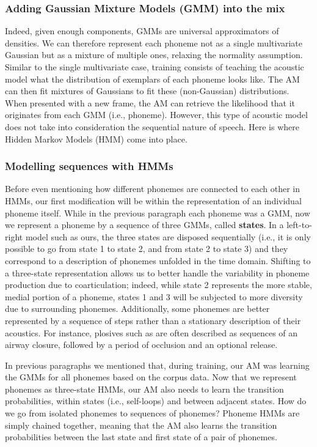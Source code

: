 \subsubsection{Adding Gaussian Mixture Models (GMM) into the mix}
Indeed, given enough components, GMMs are universal approximators of densities. We can therefore represent each phoneme not as a single multivariate Gaussian but as a mixture of multiple ones, relaxing the normality assumption. Similar to the single multivariate case, training consists of teaching the acoustic model what the distribution of exemplars of each phoneme looks like. The AM can then fit mixtures of Gaussians to fit these (non-Gaussian) distributions. When presented with a new frame, the AM can retrieve the likelihood that it originates from each GMM (i.e., phoneme). However, this type of acoustic model does not take into consideration the sequential nature of speech. Here is where Hidden Markov Models (HMM) come into place.   

\subsubsection{Modelling sequences with HMMs}
Before even mentioning how different phonemes are connected to each other in HMMs, our first modification will be within the representation of an individual phoneme itself. While in the previous paragraph each phoneme was a GMM, now we represent a phoneme by a sequence of three GMMs, called \textbf{states}. In a left-to-right model such as ours, the three states are disposed sequentially (i.e., it is only possible to go from state 1 to state 2, and from state 2 to state 3) and they correspond to a description of phonemes unfolded in the time domain. Shifting to a three-state representation allows us to better handle the variability in phoneme production due to coarticulation; indeed, while state 2 represents the more stable, medial portion of a phoneme, states 1 and 3 will be subjected to more diversity due to surrounding phonemes. Additionally, some phonemes are better represented by a sequence of steps rather than a stationary description of their acoustics. For instance, plosives such as  are often described as sequences of an airway closure, followed by a period of occlusion and an optional release.

In previous paragraphs we mentioned that, during training, our AM was learning the GMMs for all phonemes based on the corpus data. Now that we represent phonemes as three-state HMMs, our AM also needs to learn the transition probabilities, within states (i.e., self-loops) and between adjacent states. How do we go from isolated phonemes to sequences of phonemes? Phoneme HMMs are simply chained together, meaning that the AM also learns the transition probabilities between the last state and first state of a pair of phonemes.

